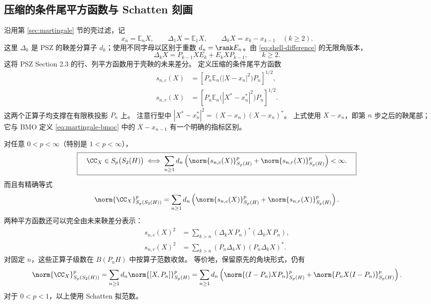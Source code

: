 \subsection{压缩的条件尾平方函数与 Schatten 刻画}

沿用第 \ref{sec:martingale} 节的壳过滤，记
\[
 x_n=\mathbb E_nX,\qquad
 \Delta_1X=\mathbb E_1X,\qquad
 \Delta_kX=x_k-x_{k-1}\quad(k\geq2).
\]
这里 $\Delta_k$ 是 PSZ 的鞅差分算子 $d_k$；使用不同字母以区别于重数
$d_n=\rank E_n$。由 \eqref{eq:shell-difference} 的无限角版本，
\begin{equation}\label{sch:eq:difference}
 \Delta_kX=P_{k-1}XE_k+E_kXP_{k-1},\qquad k\geq2.
\end{equation}
这将 PSZ Section 2.3 的行、列平方函数用于壳鞅的未来差分。
定义压缩的条件尾平方函数
\begin{align}
 s_{n,c}(X)
 &=\left[P_n\mathbb E_n\bigl(|X-x_n|^2\bigr)P_n\right]^{1/2},
       \label{sch:eq:tail-column}\\
 s_{n,r}(X)
 &=\left[P_n\mathbb E_n\bigl(|X^*-x_n^*|^2\bigr)P_n\right]^{1/2}.
       \label{sch:eq:tail-row}
\end{align}
这两个正算子均支撑在有限秩投影 $P_n$ 上。
注意行型中 $|X^*-x_n^*|^2=(X-x_n)(X-x_n)^*$。
上式使用 $X-x_n$，即第 $n$ 步之后的鞅尾部；
它与 BMO 定义 \eqref{eq:martingale-bmoc} 中的 $X-x_{n-1}$ 有一个明确的指标区别。

\begin{theorem}\label{sch:thm:main}
对任意 $0<p<\infty$（特别是 $1<p<\infty$），
\begin{equation}\label{sch:eq:criterion}
 \boxed{\quad
 \CC_X\in S_p\bigl(S_2(H)\bigr)
 \iff
 \sum_{n\geq1}d_n\left(
   \norm{s_{n,c}(X)}_{S_p(H)}^p+
   \norm{s_{n,r}(X)}_{S_p(H)}^p\right)<\infty.
 \quad}
\end{equation}
而且有精确等式
\begin{equation}\label{sch:eq:main}
 \norm{\CC_X}_{S_p(S_2(H))}^p
 =\sum_{n\geq1}d_n\left(
   \norm{s_{n,c}(X)}_{S_p(H)}^p+
   \norm{s_{n,r}(X)}_{S_p(H)}^p\right).
\end{equation}
两种平方函数还可以完全由未来鞅差分表示：
\begin{align}
 s_{n,c}(X)^2
 &=\sum_{k>n}(\Delta_kX\,P_n)^*(\Delta_kX\,P_n),
       \label{sch:eq:tail-diff-column}\\
 s_{n,r}(X)^2
 &=\sum_{k>n}(P_n\Delta_kX)(P_n\Delta_kX)^*.
       \label{sch:eq:tail-diff-row}
\end{align}
对固定 $n$，这些正算子级数在 $B(P_nH)$ 中按算子范数收敛。
等价地，保留原先的角块形式，仍有
\begin{equation}\label{sch:eq:corners}
 \norm{\CC_X}_{S_p(S_2(H))}^p
 =\sum_{n\geq1}d_n\norm{[X,P_n]}_{S_p(H)}^p
 =\sum_{n\geq1}d_n\left(
  \norm{(I-P_n)XP_n}_{S_p(H)}^p+
  \norm{P_nX(I-P_n)}_{S_p(H)}^p\right).
\end{equation}
对于 $0<p<1$，以上使用 Schatten 拟范数。
\end{theorem}


